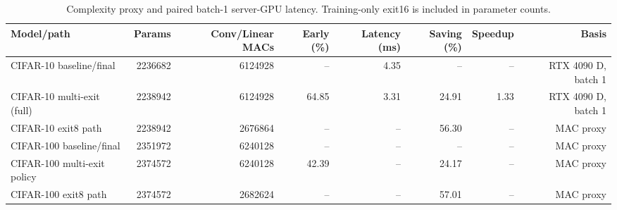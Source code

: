 \begin{table}[t]
\centering
\small
\caption{Complexity proxy and paired batch-1 server-GPU latency. Training-only exit16 is included in parameter counts.}
\label{tab:complexity-latency}
\begin{tabular}{lrrrrrrr}
\toprule
Model/path & Params & Conv/Linear MACs & Early (\%) & Latency (ms) & Saving (\%) & Speedup & Basis \\
\midrule
CIFAR-10 baseline/final & 2236682 & 6124928 & -- & 4.35 & -- & -- & RTX 4090 D, batch 1 \\
CIFAR-10 multi-exit (full) & 2238942 & 6124928 & 64.85 & 3.31 & 24.91 & 1.33 & RTX 4090 D, batch 1 \\
CIFAR-10 exit8 path & 2238942 & 2676864 & -- & -- & 56.30 & -- & MAC proxy \\
CIFAR-100 baseline/final & 2351972 & 6240128 & -- & -- & -- & -- & MAC proxy \\
CIFAR-100 multi-exit policy & 2374572 & 6240128 & 42.39 & -- & 24.17 & -- & MAC proxy \\
CIFAR-100 exit8 path & 2374572 & 2682624 & -- & -- & 57.01 & -- & MAC proxy \\
\bottomrule
\end{tabular}
\end{table}
